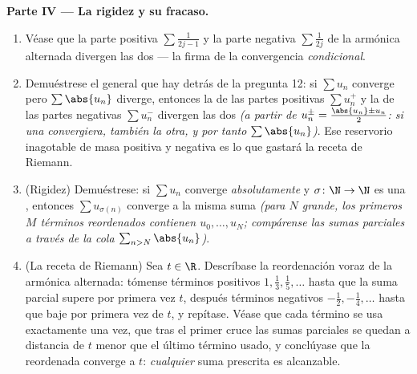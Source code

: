 \begin{problem}[{Problema del fin de semana --- $H_n = \ln n + \gamma +
\frac{1}{2n} + O(n^{-2})$, y la reordenación de
$1 - \frac12 + \frac13 - \dots$ hasta $\frac{\ln 2}{2}$}]
\medskip
\noindent\textbf{Parte IV --- La rigidez y su fracaso.}
\begin{enumerate}[resume]
  \item Véase que la parte positiva $\sum \frac{1}{2j-1}$ y la parte
        negativa $\sum \frac{1}{2j}$ de la  armónica alternada
        divergen las dos --- la firma de la convergencia
        \emph{condicional}.
  \item Demuéstrese el  general que hay detrás de la
        pregunta 12: si $\sum u_n$ converge pero $\sum \abs{u_n}$
        diverge, entonces la  de las partes positivas
        $\sum u_n^+$ y la de las partes negativas $\sum u_n^-$
        divergen las dos \emph{(a partir de
        $u_n^\pm = \frac{\abs{u_n} \pm u_n}{2}$: si una convergiera,
        también la otra, y por tanto $\sum\abs{u_n}$)}. Ese
        reservorio inagotable de masa positiva y negativa es lo que
        gastará la receta de Riemann.
  \item (Rigidez) Demuéstrese: si $\sum u_n$ converge
        \emph{absolutamente} y $\sigma \colon \N \to \N$ es una
        , entonces $\sum u_{\sigma(n)}$ converge a la misma
        suma \emph{(para $N$ grande, los primeros $M$ términos
        reordenados contienen $u_0, \dots, u_N$; compárense las
        sumas parciales a través de la cola
        $\sum_{n > N}\abs{u_n}$)}.
  \item (La receta de Riemann) Sea $t \in \R$. Descríbase la
        reordenación voraz de la  armónica alternada: tómense
        términos positivos $1, \frac13, \frac15, \dots$ hasta que la
        suma parcial supere por primera vez $t$, después términos
        negativos $-\frac12, -\frac14, \dots$ hasta que baje por
        primera vez de $t$, y repítase. Véase que cada término se
        usa exactamente una vez, que tras el primer cruce las sumas
        parciales se quedan a distancia de $t$ menor que el último
        término usado, y conclúyase que la  reordenada
        converge a $t$: \emph{cualquier} suma prescrita es alcanzable.
\end{enumerate}


\end{problem}
